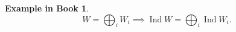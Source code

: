 \documentclass[12pt, letterpaper]{article}
\makeatletter
\newcommand{\GL}{\operatorname{GL}}
\newcommand{\Ind}{\operatorname{Ind}}
\newcommand\ie{i.e\@ifnextchar.{}{.\@}}
\newcommand{\define}{\coloneqq}
\renewcommand{\emptyset}{\varnothing}
\theoremstyle{definition}
\theoremstyle{remark}
\newtheorem*{rem*}{Remark}
\theoremstyle{definition}
\newtheorem{exam}[exe]{Example in Book}
\theoremstyle{plain}
\numberwithin{equation}{section}
\makeatother
\begin{document}
	
%		
%		
%		
%		
%		
%		
%		
%		
%		
	
	\begin{exam}
		\[W=\bigoplus_iW_i\implies \Ind W=\bigoplus_i\Ind W_i.\]
	\end{exam}
\end{document}
